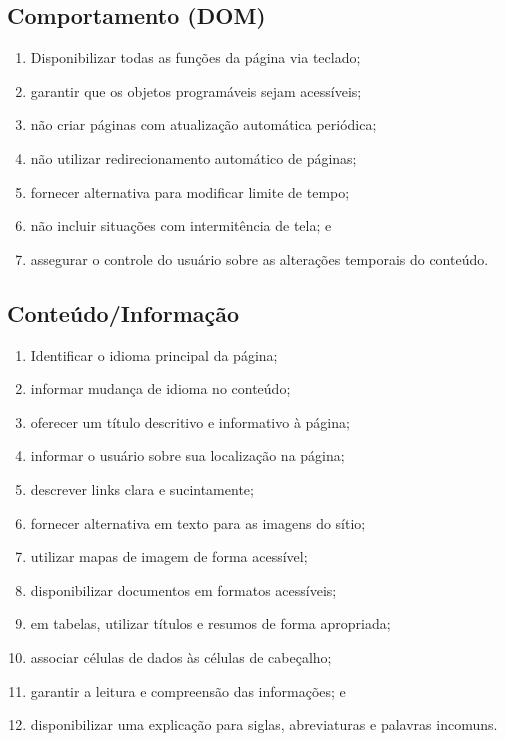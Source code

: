 \documentclass[
  12pt,
  openright,
  twoside,
  a4paper,
  english,
  french,
  spanish,
  brazil
]{abntex2}
\begin{document}
\subsection{Comportamento (DOM)}

\begin{enumerate}
  \item Disponibilizar todas as funções da página via teclado;
  \item garantir que os objetos programáveis sejam acessíveis;
  \item não criar páginas com atualização automática periódica;
  \item não utilizar redirecionamento automático de páginas;
  \item fornecer alternativa para modificar limite de tempo;
  \item não incluir situações com intermitência de tela; e
  \item
    assegurar o controle do usuário sobre as alterações temporais do conteúdo.
\end{enumerate}

\subsection{Conteúdo/Informação}

\begin{enumerate}
  \item Identificar o idioma principal da página;
  \item informar mudança de idioma no conteúdo;
  \item oferecer um título descritivo e informativo à página;
  \item informar o usuário sobre sua localização na página;
  \item descrever links clara e sucintamente;
  \item fornecer alternativa em texto para as imagens do sítio;
  \item utilizar mapas de imagem de forma acessível;
  \item disponibilizar documentos em formatos acessíveis;
  \item em tabelas, utilizar títulos e resumos de forma apropriada;
  \item associar células de dados às células de cabeçalho;
  \item garantir a leitura e compreensão das informações; e
  \item
    disponibilizar uma explicação para siglas, abreviaturas e palavras incomuns.
\end{enumerate}
\end{document}
